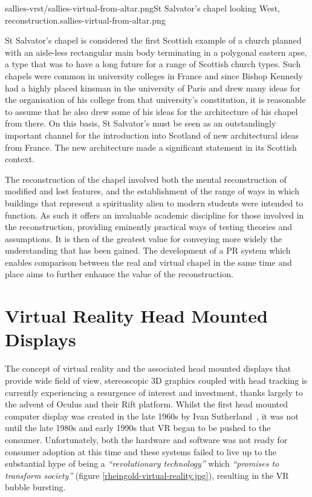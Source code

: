        {sallies-vrst/sallies-virtual-from-altar.png}{St Salvator's chapel looking West, reconstruction.}{sallies-virtual-from-altar.png}

St Salvator’s chapel is considered the first Scottish example of a church planned with an aisle-less rectangular main body terminating in a polygonal eastern apse, a type that was to have a long future for a range of Scottish church types. Such chapels were common in university colleges in France and since Bishop Kennedy had a highly placed kinsman in the university of Paris and drew many ideas for the organisation of his college from that university’s constitution, it is reasonable to assume that he also drew some of his ideas for the architecture of his chapel from there. On this basis, St Salvator’s must be seen as an outstandingly important channel for the introduction into Scotland of new architectural ideas from France. The new architecture made a significant statement in its Scottish context. 

The reconstruction of the chapel involved both the mental reconstruction of modified and lost features, and the establishment of the range of ways in which buildings that represent a spirituality alien to modern students were intended to function. As such it offers an invaluable academic discipline for those involved in the reconstruction, providing eminently practical ways of testing theories and assumptions. It is then of the greatest value for conveying more widely the understanding that has been gained. The development of a PR system which enables comparison between the real and virtual chapel in the same time and place aims to further enhance the value of the reconstruction.


\section{Virtual Reality Head Mounted Displays}
The concept of virtual reality and the associated head mounted displays that provide wide field of view, stereoscopic 3D graphics coupled with head tracking is currently experiencing a resurgence of interest and investment, thanks largely to the advent of Oculus and their Rift platform. Whilst the first head mounted computer display was created in the late 1960s by Ivan Sutherland~\cite{Rheingold1992}, it was not until the late 1980s and early 1990s that VR began to be pushed to the consumer. Unfortunately, both the hardware and software was not ready for consumer adoption at this time and these systems failed to live up to the substantial hype of being a \textit{``revolutionary technology''} which \textit{``promises to transform society''} (figure \ref{rheingold-virtual-reality.jpg}), resulting in the VR bubble bursting.

